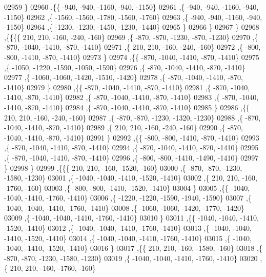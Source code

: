 \begin{DoxyCode}
02959     \}
02960    ,\{\{  -940,  -940, -1160,  -940, -1150\}
02961     ,\{  -940,  -940, -1160,  -940, -1150\}
02962     ,\{ -1560, -1560, -1780, -1560, -1760\}
02963     ,\{  -940,  -940, -1160,  -940, -1150\}
02964     ,\{ -1230, -1230, -1450, -1230, -1440\}
02965     \}
02966    \}
02967   \}
02968  ,\{\{\{\{   210,   210,  -160,  -240,  -160\}
02969     ,\{  -870,  -870, -1230,  -870, -1230\}
02970     ,\{  -870, -1040, -1410,  -870, -1410\}
02971     ,\{   210,   210,  -160,  -240,  -160\}
02972     ,\{  -800,  -800, -1410,  -870, -1410\}
02973     \}
02974    ,\{\{  -870, -1040, -1410,  -870, -1410\}
02975     ,\{ -1050, -1220, -1590, -1050, -1590\}
02976     ,\{  -870, -1040, -1410,  -870, -1410\}
02977     ,\{ -1060, -1060, -1420, -1510, -1420\}
02978     ,\{  -870, -1040, -1410,  -870, -1410\}
02979     \}
02980    ,\{\{  -870, -1040, -1410,  -870, -1410\}
02981     ,\{  -870, -1040, -1410,  -870, -1410\}
02982     ,\{  -870, -1040, -1410,  -870, -1410\}
02983     ,\{  -870, -1040, -1410,  -870, -1410\}
02984     ,\{  -870, -1040, -1410,  -870, -1410\}
02985     \}
02986    ,\{\{   210,   210,  -160,  -240,  -160\}
02987     ,\{  -870,  -870, -1230, -1320, -1230\}
02988     ,\{  -870, -1040, -1410,  -870, -1410\}
02989     ,\{   210,   210,  -160,  -240,  -160\}
02990     ,\{  -870, -1040, -1410,  -870, -1410\}
02991     \}
02992    ,\{\{  -800,  -800, -1410,  -870, -1410\}
02993     ,\{  -870, -1040, -1410,  -870, -1410\}
02994     ,\{  -870, -1040, -1410,  -870, -1410\}
02995     ,\{  -870, -1040, -1410,  -870, -1410\}
02996     ,\{  -800,  -800, -1410, -1490, -1410\}
02997     \}
02998    \}
02999   ,\{\{\{   210,   210,  -160, -1520,  -160\}
03000     ,\{  -870,  -870, -1230, -1580, -1230\}
03001     ,\{ -1040, -1040, -1410, -1520, -1410\}
03002     ,\{   210,   210,  -160, -1760,  -160\}
03003     ,\{  -800,  -800, -1410, -1520, -1410\}
03004     \}
03005    ,\{\{ -1040, -1040, -1410, -1760, -1410\}
03006     ,\{ -1220, -1220, -1590, -1940, -1590\}
03007     ,\{ -1040, -1040, -1410, -1760, -1410\}
03008     ,\{ -1060, -1060, -1420, -1770, -1420\}
03009     ,\{ -1040, -1040, -1410, -1760, -1410\}
03010     \}
03011    ,\{\{ -1040, -1040, -1410, -1520, -1410\}
03012     ,\{ -1040, -1040, -1410, -1760, -1410\}
03013     ,\{ -1040, -1040, -1410, -1520, -1410\}
03014     ,\{ -1040, -1040, -1410, -1760, -1410\}
03015     ,\{ -1040, -1040, -1410, -1520, -1410\}
03016     \}
03017    ,\{\{   210,   210,  -160, -1580,  -160\}
03018     ,\{  -870,  -870, -1230, -1580, -1230\}
03019     ,\{ -1040, -1040, -1410, -1760, -1410\}
03020     ,\{   210,   210,  -160, -1760,  -160\}

\end{DoxyCode}

